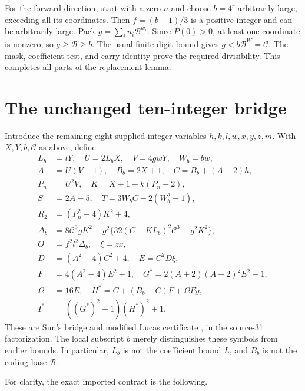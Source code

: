 \documentclass[11pt,letterpaper]{article}
\newcommand{\B}{\mathcal B}
\newcommand{\capc}{\mathscr C}
\theoremstyle{remark}
\begin{document}
For the forward direction, start with a zero \(n\) and choose
\(b=4^r\) arbitrarily large, exceeding all its coordinates. Then
\(f=(b-1)/3\) is a positive integer and can be arbitrarily large.
Pack \(g=\sum_i n_i\B^{w_i}\).
Since \(P(0)>0\), at least one coordinate is nonzero, so \(g\ge\B\ge b\).
The usual finite-digit bound gives \(g<b\B^W=\capc\).
The mask, coefficient test, and carry identity prove the required
divisibility. This completes all parts of the replacement lemma.

\section{The unchanged ten-integer bridge}
\label{sec:bridge}

Introduce the remaining eight supplied integer variables
\(h,k,l,w,x,y,z,m\). With \(X,Y,b,\capc\) as above, define
\begin{align}
L_b&=lY,\quad U=2L_bX,\quad V=4gwY,\quad W_b=bw,\nonumber\\
A&=U(V+1),\quad B_b=2X+1,\quad C=B_b+(A-2)h,\nonumber\\
P_n&=U^2V,\quad K=X+1+k(P_n-2),\nonumber\\
S&=2A-5,\quad T=3W_bC-2(W_b^2-1),\nonumber\\
R_2&=(P_n^2-4)K^2+4,\nonumber\\
\Delta_b&=8\capc^3gK^2
 -g^2\{32(C-KL_b)^2\capc^3+g^2K^2\},\nonumber\\
O&=f^2l^2\Delta_b,\quad \xi=zx,\nonumber\\
D&=(A^2-4)C^2+4,\quad E=C^2D\xi,\nonumber\\
F&=4(A^2-4)E^2+1,\quad
G^*=2(A+2)(A-2)^2E^2-1,\nonumber\\
\Omega&=16E,\quad H^*=C+(B_b-C)F+\Omega Fy,\nonumber\\
I^*&=((G^*)^2-1)(H^*)^2+1.
\label{eq:bridge}
\end{align}
These are Sun's bridge and modified Lucas certificate
\cite[Propositions 6.1--6.2 and Theorems 3.1, 4.1]{sun2026}, in the
source-31 factorization. The local subscript \(b\) merely distinguishes
these symbols from earlier bounds. In particular, \(L_b\) is not the
coefficient bound \(L\), and \(B_b\) is not the coding base \(\B\).

For clarity, the exact imported contract is the following.
\end{document}

